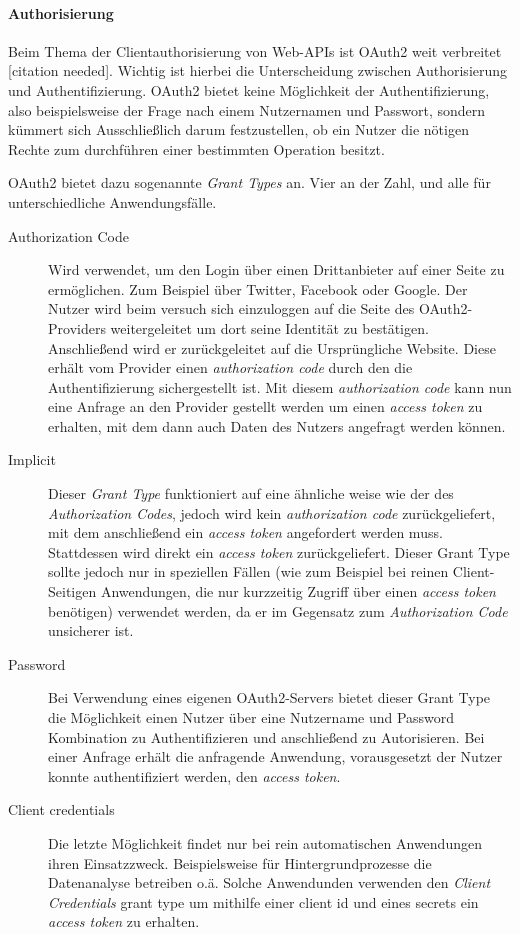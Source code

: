 \documentclass[12pt,a4paper,bibliography=totocnumbered,listof=totocnumbered]{scrartcl}
\begin{document}
\paragraph{Authorisierung}

Beim Thema der Clientauthorisierung von Web-\ac{API}s ist OAuth2 weit verbreitet [citation needed]. Wichtig ist hierbei die Unterscheidung zwischen Authorisierung und Authentifizierung. OAuth2 bietet keine Möglichkeit der Authentifizierung, also beispielsweise der Frage nach einem Nutzernamen und Passwort, sondern kümmert sich Ausschließlich darum festzustellen, ob ein Nutzer die nötigen Rechte zum durchführen einer bestimmten Operation besitzt.\cite{degges}

OAuth2 bietet dazu sogenannte \textit{Grant Types} an. Vier an der Zahl, und alle für unterschiedliche Anwendungsfälle.

\begin{description}  
	\item [Authorization Code] Wird verwendet, um den Login über einen Drittanbieter auf einer Seite zu ermöglichen. Zum Beispiel über Twitter, Facebook oder Google. Der Nutzer wird beim versuch sich einzuloggen auf die Seite des OAuth2-Providers weitergeleitet um dort seine Identität zu bestätigen. Anschließend wird er zurückgeleitet auf die Ursprüngliche Website. Diese erhält vom Provider einen \textit{authorization code} durch den die Authentifizierung sichergestellt ist. Mit diesem \textit{authorization code} kann nun eine Anfrage an den Provider gestellt werden um einen \textit{access token} zu erhalten, mit dem dann auch Daten des Nutzers angefragt werden können.\cite{degges}
	\item [Implicit] Dieser \textit{Grant Type} funktioniert auf eine ähnliche weise wie der des \textit{Authorization Codes}, jedoch wird kein \textit{authorization code} zurückgeliefert, mit dem anschließend ein \textit{access token} angefordert werden muss. Stattdessen wird direkt ein \textit{access token} zurückgeliefert.\cite{degges} Dieser Grant Type sollte jedoch nur in speziellen Fällen (wie zum Beispiel bei reinen Client-Seitigen Anwendungen, die nur kurzzeitig Zugriff über einen \textit{access token} benötigen) verwendet werden, da er im Gegensatz zum \textit{Authorization Code} unsicherer ist.
	\item [Password] Bei Verwendung eines eigenen OAuth2-Servers bietet dieser Grant Type die Möglichkeit einen Nutzer über eine Nutzername und Password Kombination zu Authentifizieren und anschließend zu Autorisieren. Bei einer Anfrage erhält die anfragende Anwendung, vorausgesetzt der Nutzer konnte authentifiziert werden, den \textit{access token}.\cite{degges}
	\item [Client credentials] Die letzte Möglichkeit findet nur bei rein automatischen Anwendungen ihren Einsatzzweck. Beispielsweise für Hintergrundprozesse die Datenanalyse betreiben o.ä. Solche Anwendunden verwenden den \textit{Client Credentials} grant type um mithilfe einer client id und eines secrets ein \textit{access token} zu erhalten.\cite{degges}
\end{description}
\end{document}
